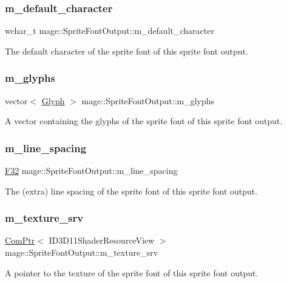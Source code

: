 \subsubsection{\texorpdfstring{m\+\_\+default\+\_\+character}{m\_default\_character}}
{\footnotesize\ttfamily wchar\+\_\+t mage\+::\+Sprite\+Font\+Output\+::m\+\_\+default\+\_\+character}

The default character of the sprite font of this sprite font output. \hypertarget{structmage_1_1_sprite_font_output_aee63c847a919bce662dee371594607dd}{}\label{structmage_1_1_sprite_font_output_aee63c847a919bce662dee371594607dd} 
\subsubsection{\texorpdfstring{m\+\_\+glyphs}{m\_glyphs}}
{\footnotesize\ttfamily vector$<$ \hyperlink{structmage_1_1_glyph}{Glyph} $>$ mage\+::\+Sprite\+Font\+Output\+::m\+\_\+glyphs}

A vector containing the glyphs of the sprite font of this sprite font output. \hypertarget{structmage_1_1_sprite_font_output_afa189d48c92167f6a01f63a1616b7c95}{}\label{structmage_1_1_sprite_font_output_afa189d48c92167f6a01f63a1616b7c95} 
\subsubsection{\texorpdfstring{m\+\_\+line\+\_\+spacing}{m\_line\_spacing}}
{\footnotesize\ttfamily \hyperlink{namespacemage_aa97e833b45f06d60a0a9c4fc22ae02c0}{F32} mage\+::\+Sprite\+Font\+Output\+::m\+\_\+line\+\_\+spacing}

The (extra) line spacing of the sprite font of this sprite font output. \hypertarget{structmage_1_1_sprite_font_output_abece35d0abdacf81538969a3ec8a5617}{}\label{structmage_1_1_sprite_font_output_abece35d0abdacf81538969a3ec8a5617} 
\subsubsection{\texorpdfstring{m\+\_\+texture\+\_\+srv}{m\_texture\_srv}}
{\footnotesize\ttfamily \hyperlink{namespacemage_ae74f374780900893caa5555d1031fd79}{Com\+Ptr}$<$ I\+D3\+D11\+Shader\+Resource\+View $>$ mage\+::\+Sprite\+Font\+Output\+::m\+\_\+texture\+\_\+srv}

A pointer to the texture of the sprite font of this sprite font output. 